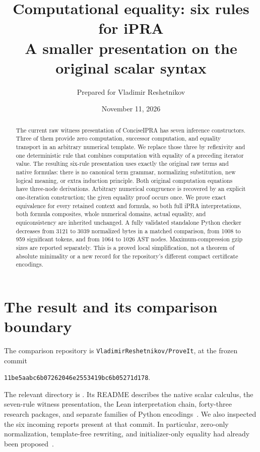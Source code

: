 \documentclass[11pt]{article}
\title{\textbf{Computational equality: six rules for iPRA}\\[4pt]
\large A smaller presentation on the original scalar syntax}
\author{Prepared for Vladimir Reshetnikov}
\date{November 11, 2026}
\theoremstyle{definition}
\begin{document}
\maketitle
\begin{abstract}
The current raw witness presentation of ConciseIPRA has seven inference
constructors. Three of them provide zero computation, successor computation,
and equality transport in an arbitrary numerical template. We replace those
three by reflexivity and one deterministic rule that combines computation
with equality of a preceding iterator value. The resulting six-rule
presentation uses exactly the original raw terms and native formulas:
there is no canonical term grammar, normalizing substitution, new logical
meaning, or extra induction principle. Both original computation equations
have three-node derivations. Arbitrary numerical congruence is recovered by
an explicit one-iteration construction; the given equality proof occurs
once. We prove exact equivalence for every retained context and formula,
so both full iPRA interpretations, both formula composites, whole numerical
domains, actual equality, and equiconsistency are inherited unchanged.
A fully validated standalone Python checker decreases from 3121 to 3039
normalized bytes in a matched comparison, from 1008 to 959 significant
tokens, and from 1064 to 1026 AST nodes. Maximum-compression gzip sizes are
reported separately. This is a proved local simplification, not a theorem
of absolute minimality or a new record for the repository's different
compact certificate encodings.
\end{abstract}

\section{The result and its comparison boundary}

The comparison repository is \texttt{VladimirReshetnikov/ProveIt}, at the
frozen commit
\begin{center}\small\texttt{11be5aabc6b07262046e2553419bc6b05271d178}.\end{center}
The relevant directory is
.
Its README describes the native scalar calculus, the seven-rule witness
presentation, the Lean interpretation chain, forty-three research packages,
and separate families of Python encodings~\cite{repo}. We also inspected
the six incoming reports present at that commit. In particular, zero-only
normalization, template-free rewriting, and initializer-only equality had
already been proposed~\cite{incoming}.
\end{document}
